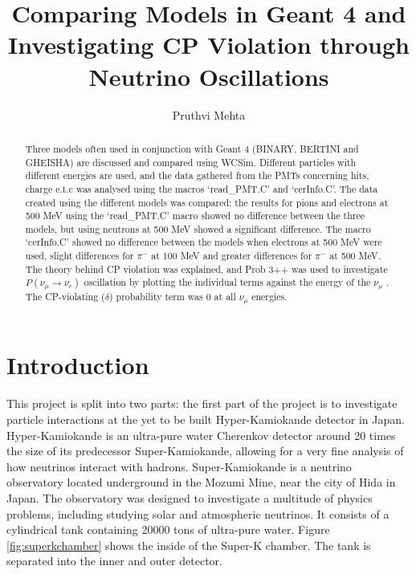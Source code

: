 \documentclass[11pt,oneside,a4paper]{article}
\begin{document}
\title {Comparing Models in Geant 4 and Investigating CP Violation through Neutrino Oscillations}
\author{Pruthvi Mehta}

\maketitle


\begin{abstract}
Three models often used in conjunction with Geant 4 (BINARY, BERTINI and GHEISHA) are discussed and compared using WCSim. Different particles with different energies are used, and the data gathered from the PMTs concerning hits, charge e.t.c was analysed using the macros `read\_PMT.C' and `cerInfo.C'. The data created using the different models was compared: the results for pions and electrons at 500 MeV using the `read\_PMT.C' macro showed no difference between the three models, but using neutrons at 500 MeV showed a significant difference. The macro `cerInfo.C' showed no difference between the models when electrons at 500 MeV were used, slight differences for $\pi^-$ at 100 MeV and greater differences for $\pi^-$ at 500 MeV. The theory behind CP violation was explained, and Prob 3++ was used to investigate $P(\nu_{\mu} \rightarrow \nu_{e})$ oscillation by plotting the individual terms against the energy of the $\nu_{\mu}$ . The CP-violating ($\delta$) probability term was 0 at all $\nu_{\mu}$ energies.

\end{abstract}
\newpage
\tableofcontents

\newpage
\section{Introduction}

This project is split into two parts: the first part of the  project is to investigate particle interactions at the yet to be built Hyper-Kamiokande detector in Japan. Hyper-Kamiokande is an ultra-pure water Cherenkov detector around 20 times the size of its predecessor Super-Kamiokande, allowing for a very fine analysis of how neutrinos interact with hadrons. Super-Kamiokande is a neutrino observatory located underground in the Mozumi Mine, near the city of Hida in Japan. The observatory was designed to investigate a multitude of physics problems, including studying solar and atmospheric neutrinos. It consists of a cylindrical tank containing 20000 tons of ultra-pure water. Figure \ref{fig:superkchamber} shows the inside of the Super-K chamber. The tank is separated into the inner and outer detector.\par
\end{document}
